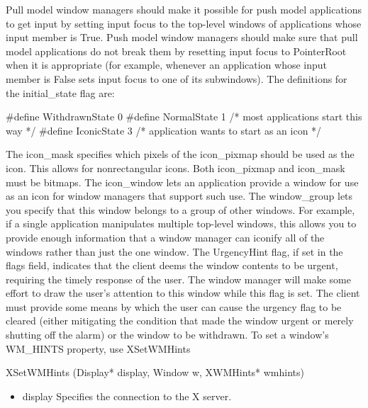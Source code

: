 \documentclass{report}
\begin{document}
\begin{itemize}
\begin{itemize}
            \bigbreak \noindent 
            Pull model window managers should make it possible for push model applications to get input by setting input focus to the top-level windows of applications whose input member is True. Push model window managers should make sure that pull model applications do not break them by resetting input focus to PointerRoot when it is appropriate (for example, whenever an application whose input member is False sets input focus to one of its subwindows).
            \bigbreak \noindent 
            The definitions for the initial\_state flag are:
            \bigbreak \noindent 
            \begin{cppcode}
                #define WithdrawnState 0
                #define NormalState 1           /* most applications start this way */
                #define IconicState 3           /* application wants to start as an icon */
            \end{cppcode}
            \bigbreak \noindent 
            The icon\_mask specifies which pixels of the icon\_pixmap should be used as the icon. This allows for nonrectangular icons. Both icon\_pixmap and icon\_mask must be bitmaps. The icon\_window lets an application provide a window for use as an icon for window managers that support such use. The window\_group lets you specify that this window belongs to a group of other windows. For example, if a single application manipulates multiple top-level windows, this allows you to provide enough information that a window manager can iconify all of the windows rather than just the one window.
            \bigbreak \noindent 
            The UrgencyHint flag, if set in the flags field, indicates that the client deems the window contents to be urgent, requiring the timely response of the user. The window manager will make some effort to draw the user’s attention to this window while this flag is set. The client must provide some means by which the user can cause the urgency flag to be cleared (either mitigating the condition that made the window urgent or merely shutting off the alarm) or the window to be withdrawn.
            \bigbreak \noindent 
            To set a window’s WM\_HINTS property, use XSetWMHints
            \bigbreak \noindent 
            \begin{cppcode}
            XSetWMHints (Display* display, Window w, XWMHints* wmhints)
            \end{cppcode}
            \begin{itemize}
                \item display Specifies the connection to the X server.

\end{itemize}
\end{itemize}
\end{itemize}
\end{document}
